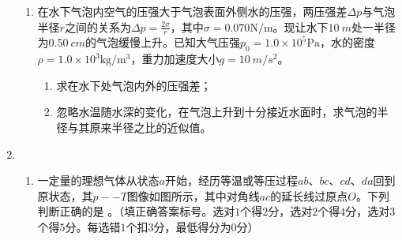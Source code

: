 \begin{enumerate}[leftmargin=0em]
\begin{enumerate}
\item 
在水下气泡内空气的压强大于气泡表面外侧水的压强，两压强差$ \Delta p $与气泡半径$ r $之间的关系为$\Delta p = \frac { 2 \sigma } { r }$，其中$\sigma = 0.070 \mathrm { N } / \mathrm { m }$。现让水下$ 10\ m $处一半径为$ 0.50\ cm $的气泡缓慢上升。已知大气压强$p _ { 0 } = 1.0 \times 10 ^ { 5 } \mathrm { Pa }$，水的密度$\rho = 1.0 \times 10 ^ { 3 } \mathrm { kg } / \mathrm { m } ^ { 3 }$，重力加速度大小$ g=10\ m/s^{2} $。
\begin{enumerate}
\renewcommand{\labelenumi}{\arabic{enumi}.}
\item
求在水下处气泡内外的压强差；
\item 
忽略水温随水深的变化，在气泡上升到十分接近水面时，求气泡的半径与其原来半径之比的近似值。



\end{enumerate}





\end{enumerate}




\newpage	
\item 
{}
\begin{enumerate}
\renewcommand{\labelenumi}{\arabic{enumi}.}
\item
一定量的理想气体从状态$ a $开始，经历等温或等压过程$ ab $、$ bc $、$ cd $、$ da $回到原状态，其$ p -- T $图像如图所示，其中对角线$ ac $的延长线过原点$ O $。下列判断正确的是  
。（填正确答案标号。选对$ 1 $个得$ 2 $分，选对$ 2 $个得$ 4 $分，选对$ 3 $个得$ 5 $分。每选错$ 1 $个扣$ 3 $分，最低得分为$ 0 $分）
\begin{figure}[h!]
\centering

\end{figure}


\end{enumerate}
\end{enumerate}
